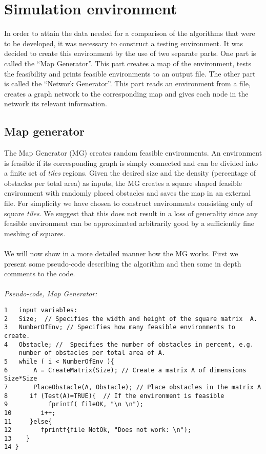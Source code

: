 \chapter{Simulation environment}
In order to attain the data needed for a comparison of the algorithms that were to be developed, it was necessary to construct a testing environment. It was decided to create this environment by the use of two separate parts. One part is called the ``Map Generator''. This part creates a map of the environment, tests the feasibility and prints feasible environments to an output file. The other part is called the ``Network Generator''. This part reads an environment from a file, creates a graph network to the corresponding map and gives each node in the network its relevant information.
%
\section{Map generator}
The Map Generator (MG) creates random feasible environments. An environment is feasible if its corresponding graph is simply connected and can be divided into a finite set of \emph{tiles} regions. Given the desired size and the density (percentage of obstacles per total area) as inputs, the MG creates a square shaped feasible environment with randomly placed obstacles and saves the map in an external file. For simplicity we have chosen to construct environments consisting only of square \emph{tiles}. %
We suggest that this does not result in a loss of generality since any feasible environment can be approximated arbitrarily good by a sufficiently fine meshing of squares. \\ %
\\We will now show in a more detailed manner how the MG works. First we present some pseudo-code describing the algorithm and then some in depth comments to the code.\\
\\\noindent\emph{Pseudo-code, Map Generator:}
\begin{verbatim}
1   input variables:
2   Size;  // Specifies the width and height of the square matrix  A.
3   NumberOfEnv; // Specifies how many feasible environments to create.
4   Obstacle; //  Specifies the number of obstacles in percent, e.g. 
    number of obstacles per total area of A.
5   while ( i < NumberOfEnv ){
6       A = CreateMatrix(Size); // Create a matrix A of dimensions Size*Size
7       PlaceObstacle(A, Obstacle); // Place obstacles in the matrix A
8      if (Test(A)=TRUE){  // If the environment is feasible
9           fprintf( fileOK, "\n \n");
10        i++;
11     }else{
12        fprintf{file NotOk, "Does not work: \n");
13    }
14 }
\end{verbatim}
